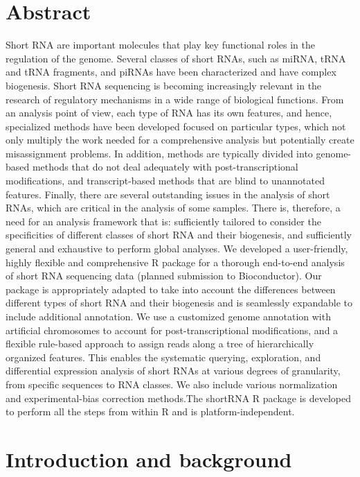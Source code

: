 \documentclass[12pt,twoside]{reedthesis}
\begin{document}
\hypertarget{abstract-2}{%
\section{Abstract}\label{abstract-2}}

Short RNA are important molecules that play key functional roles in the
regulation of the genome. Several classes of short RNAs, such as miRNA,
tRNA and tRNA fragments, and piRNAs have been characterized and have
complex biogenesis. Short RNA sequencing is becoming increasingly
relevant in the research of regulatory mechanisms in a wide range of
biological functions. From an analysis point of view, each type of RNA
has its own features, and hence, specialized methods have been developed
focused on particular types, which not only multiply the work needed for
a comprehensive analysis but potentially create misassignment problems.
In addition, methods are typically divided into genome-based methods
that do not deal adequately with post-transcriptional modifications, and
transcript-based methods that are blind to unannotated features.
Finally, there are several outstanding issues in the analysis of short
RNAs, which are critical in the analysis of some samples. There is,
therefore, a need for an analysis framework that is: sufficiently
tailored to consider the specificities of different classes of short RNA
and their biogenesis, and sufficiently general and exhaustive to perform
global analyses. We developed a user-friendly, highly flexible and
comprehensive R package for a thorough end-to-end analysis of short RNA
sequencing data (planned submission to Bioconductor). Our package is
appropriately adapted to take into account the differences between
different types of short RNA and their biogenesis and is seamlessly
expandable to include additional annotation. We use a customized genome
annotation with artificial chromosomes to account for
post-transcriptional modifications, and a flexible rule-based approach
to assign reads along a tree of hierarchically organized features. This
enables the systematic querying, exploration, and differential
expression analysis of short RNAs at various degrees of granularity,
from specific sequences to RNA classes. We also include various
normalization and experimental-bias correction methods.The shortRNA R
package is developed to perform all the steps from within R and is
platform-independent.

\hypertarget{introduction-and-background}{%
\section{Introduction and background}\label{introduction-and-background}}
\end{document}
